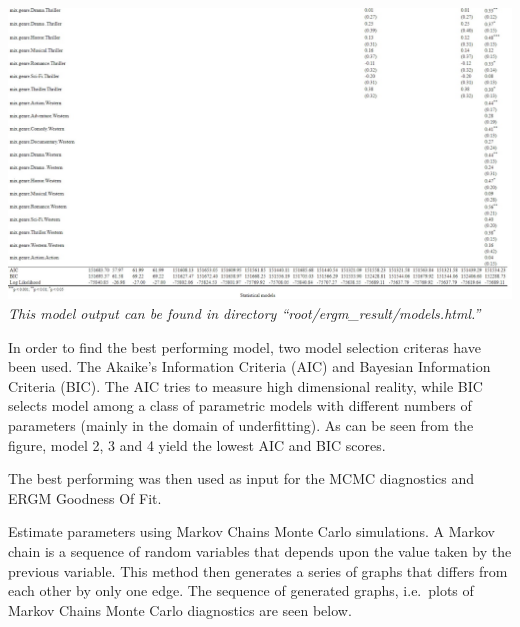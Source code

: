\documentclass[
  english,
  man,floatsintext]{apa6}
\begin{document}
\includegraphics{ergm_result/model_result4.jpeg}
\emph{This model output can be found in directory ``root/ergm\_result/models.html.''}

In order to find the best performing model, two model selection criteras have been used. The Akaike's Information Criteria (AIC) and Bayesian Information Criteria (BIC). The AIC tries to measure high dimensional reality, while BIC selects model among a class of parametric models with different numbers of parameters (mainly in the domain of underfitting).
As can be seen from the figure, model 2, 3 and 4 yield the lowest AIC and BIC scores.

The best performing was then used as input for the MCMC diagnostics and ERGM Goodness Of Fit.

Estimate parameters using Markov Chains Monte Carlo simulations. A Markov chain is a sequence of random variables that depends upon the value taken by the previous variable. This method then generates a series of graphs that differs from each other by only one edge.
The sequence of generated graphs, i.e.~plots of Markov Chains Monte Carlo diagnostics are seen below.
\end{document}

